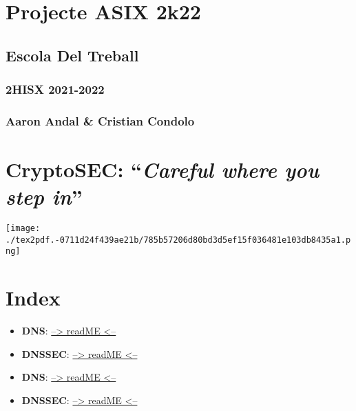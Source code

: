 \documentclass[]{article}
\date{}
\begin{document}
\hypertarget{projecte-asix-2k22}{%
\section{\texorpdfstring{\textbf{Projecte ASIX
2k22}}{Projecte ASIX 2k22}}\label{projecte-asix-2k22}}

\hypertarget{escola-del-treball}{%
\subsection{\texorpdfstring{\textbf{Escola Del
Treball}}{Escola Del Treball}}\label{escola-del-treball}}

\hypertarget{hisx-2021-2022}{%
\subsubsection{\texorpdfstring{\textbf{2HISX
2021-2022}}{2HISX 2021-2022}}\label{hisx-2021-2022}}

\hypertarget{aaron-andal-cristian-condolo}{%
\subsubsection{\texorpdfstring{\textbf{Aaron Andal \& Cristian
Condolo}}{Aaron Andal \& Cristian Condolo}}\label{aaron-andal-cristian-condolo}}

\hypertarget{cryptosec-careful-where-you-step-in}{%
\section{\texorpdfstring{\textbf{CryptoSEC}: ``\emph{Careful where you
step
in}''}{CryptoSEC: ``Careful where you step in''}}\label{cryptosec-careful-where-you-step-in}}

\texttt{[image: ./tex2pdf.-0711d24f439ae21b/785b57206d80bd3d5ef15f036481e103db8435a1.png]}

\hypertarget{index}{%
\section{\texorpdfstring{\textbf{Index}}{Index}}\label{index}}

\begin{itemize}
\item
  \textbf{DNS}: \href{}{--\textgreater{} readME \textless{}--}
\item
  \textbf{DNSSEC}: \href{}{--\textgreater{} readME \textless{}--}
\item
  \textbf{DNS}: \href{}{--\textgreater{} readME \textless{}--}
\item
  \textbf{DNSSEC}: \href{}{--\textgreater{} readME \textless{}--}
\end{itemize}
\end{document}
